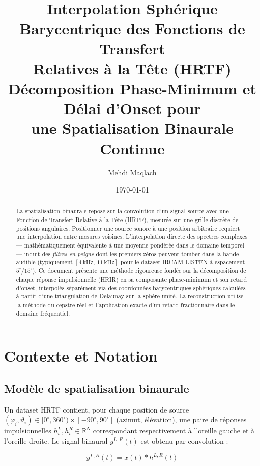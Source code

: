 \documentclass[12pt, a4paper]{article}
\title{%
  \textbf{Interpolation Sphérique Barycentrique des Fonctions de Transfert \\
  Relatives à la Tête (HRTF)} \\[0.5em]
  \large Décomposition Phase-Minimum et Délai d'Onset pour \\
  une Spatialisation Binaurale Continue
}
\author{Mehdi Maqlach}
\date{\today}
\theoremstyle{definition}
\newcommand{\R}{\mathbb{R}}
\begin{document}
\maketitle

\begin{abstract}
La spatialisation binaurale repose sur la convolution d'un signal source avec
une Fonction de Transfert Relative à la Tête (HRTF), mesurée sur une grille
discrète de positions angulaires. Positionner une source sonore à une position
arbitraire requiert une interpolation entre mesures voisines.
L'interpolation directe des spectres complexes — mathématiquement équivalente
à une moyenne pondérée dans le domaine temporel — induit des
\emph{filtres en peigne} dont les premiers zéros peuvent tomber dans la bande
audible (typiquement $[4\,\text{kHz},\,11\,\text{kHz}]$ pour le dataset
IRCAM LISTEN à espacement $5^\circ$/$15^\circ$).
Ce document présente une méthode rigoureuse fondée sur la décomposition de
chaque réponse impulsionnelle (HRIR) en sa composante phase-minimum et son
retard d'onset, interpolés séparément via des coordonnées barycentriques
sphériques calculées à partir d'une triangulation de Delaunay sur la sphère
unité. La reconstruction utilise la méthode du cepstre réel et l'application
exacte d'un retard fractionnaire dans le domaine fréquentiel.
\end{abstract}

\tableofcontents
\newpage

\section{Contexte et Notation}

\subsection{Modèle de spatialisation binaurale}

Un dataset HRTF contient, pour chaque position de source
$(\varphi_i, \vartheta_i) \in [0^\circ, 360^\circ) \times [-90^\circ, 90^\circ]$
(azimut, élévation), une paire de réponses impulsionnelles
$h_i^L, h_i^R \in \R^N$ correspondant respectivement à l'oreille gauche et à
l'oreille droite. Le signal binaural $y^{L,R}(t)$ est obtenu par convolution :

\begin{equation}
  y^{L,R}(t) = x(t) * h^{L,R}(t)
\end{equation}
\end{document}
